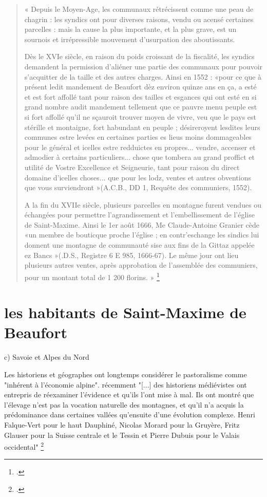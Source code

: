 \documentclass[12pt,a4paper]{report}
\begin{document}
\begin{quote}
	« Depuis le Moyen-Age, les communaux rétrécissent comme une peau de chagrin : les syndics ont pour diverses raisons, vendu ou acensé certaines parcelles : mais la cause la plus importante, et la plus grave, est un sournois et irrépressible mouvement d'usurpation des aboutissants.
	
	Dès le XVIe siècle, en raison du poids croissant de la fiscalité, les syndics demandent la permission d'aliéner une partie des communaux pour pouvoir s'acquitter de la taille et des autres charges. Ainsi en 1552 : «pour ce que à présent ledit mandement de Beaufort dèz environ quinze ans en ça, a esté et est fort affollé tant pour raison des tailles et esgances qui ont esté en si grand nombre audit mandement tellement que ce pauvre menu peuple est si fort affollé qu'il ne sçauroit trouver moyen de vivre, veu que le pays est stérille et montaigne, fort habundant en peuple ; désireroyent lesdites leurs communes estre levées en certaines parties es lieus moins dommageables pour le général et icelles estre redduictes en propres... vendre, accenser et admodier à certains particuliers... chose que tombera au grand proffict et utilité de Vostre Excellence et Seigneurie, tant pour raison du direct domaine d'icelles choses... que pour les lodz, ventes et autres obventions que vous surviendront »(A.C.B., DD 1, Requête des communiers, 1552).
	
	A la fin du XVIIe siècle, plusieurs parcelles en montagne furent vendues ou échangées pour permettre l'agrandissement et l'embellissement de l'église de Saint-Maxime. Ainsi le 1er août 1666, Me Claude-Antoine Granier cède «un membre de bouticque proche l'église ; en contr'eschange les sindics lui donnent une montagne de communauté sise aux fins de la Gittaz appelée ez Bancs »(.D.S., Registre 6 E 985, 1666-67). Le même jour ont lieu plusieurs autres ventes, après approbation de l'assemblée des communiers, pour un montant total de 1 200 florins. »
	\footcite[66--67]{HViallet1993}
\end{quote}

\section{les habitants de Saint-Maxime de Beaufort}

c)	Savoie et Alpes du Nord

Les historiens et géographes ont longtemps considérer le pastoralisme comme "inhérent à l'économie alpine". récemment "[...] des historiens médiévistes ont entrepris de réexaminer l’évidence et qu’ils l’ont mise à mal. Ils ont montré que l’élevage n’est pas la vocation naturelle des montagnes, et qu’il n’a acquis la prédominance dans certaines vallées qu’ensuite d’une évolution complexe. Henri Falque-Vert pour le haut Dauphiné, Nicolas Morard pour la Gruyère, Fritz Glauser pour la Suisse centrale et le Tessin et Pierre Dubuis pour le Valais occidental" \footcite{NCarrierEstivage}
\end{document}
